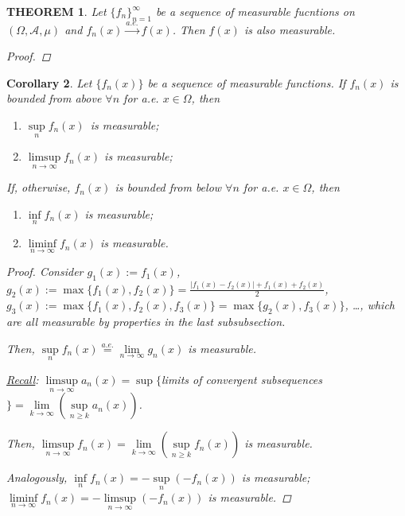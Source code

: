 \documentclass[12pt]{article}
\theoremstyle{blueplain}
\newtheorem{theorem}{THEOREM}[section]
\newtheorem{corollary}[theorem]{Corollary}
\theoremstyle{bluedef}
\theoremstyle{blueremark}
\numberwithin{equation}{section}
\begin{document}
\begin{theorem}
  Let $\{f_n\}_{n=1}^{\infty}$ be a sequence of measurable fucntions on $(\Omega, \mathcal{A}, \mu)$ and $f_n(x) \overset{a.e.}{\rightarrow} f(x)$. Then $f(x)$ is also measurable.
  \begin{proof}

  \end{proof}
\end{theorem}

\begin{corollary}
  Let $\{f_n(x)\}$ be a sequence of measurable functions. If $f_n(x)$ is bounded from above $\forall n$ for a.e. $x \in \Omega$, then

  \begin{enumerate}
    \item $\sup\limits_{n} f_n(x)$\ is measurable;
    \item $\limsup\limits_{n \to \infty} f_n(x)$ is measurable;
  \end{enumerate}

  If, otherwise, $f_n(x)$ is bounded from below $\forall n$ for a.e. $x \in \Omega$, then
  \begin{enumerate}
    \item $\inf\limits_{n} f_n(x)$ is measurable;
    \item $\liminf\limits_{n \to \infty} f_n(x)$ is measurable.
  \end{enumerate}

  \begin{proof}
    Consider $g_1(x) := f_1(x)$, $g_2(x) := \max\{f_1(x), f_2(x)\} = \frac{|f_1(x) - f_2(x)| + f_1(x) + f_2(x)}{2}$, $g_3(x) := \max\{f_1(x), f_2(x), f_3(x)\} = \max\{g_2(x), f_3(x)\}$, \ldots, which are all measurable by properties in the last subsubsection.

    Then, $\sup\limits_{n} f_n(x) \overset{a.e.}{=} \lim\limits_{n \to \infty} g_n(x)$ is measurable.

    \underline{Recall}: $\limsup\limits_{n \to \infty} a_n(x) = \sup \{$limits of convergent subsequences$\} = \lim\limits_{k \to \infty} (\sup\limits_{n \geq k} a_n(x))$.

    Then, $\limsup\limits_{n \to \infty} f_n(x) = \lim\limits_{k \to \infty} (\sup\limits_{n \geq k} f_n(x))$ is measurable.

    Analogously, $\inf\limits_{n} f_n(x) = - \sup\limits_{n} (-f_n(x))$ is measurable; $\liminf\limits_{n \to \infty} f_n(x) = - \limsup\limits_{n \to \infty} (-f_n(x))$ is measurable.
  \end{proof}
\end{corollary}
\end{document}
